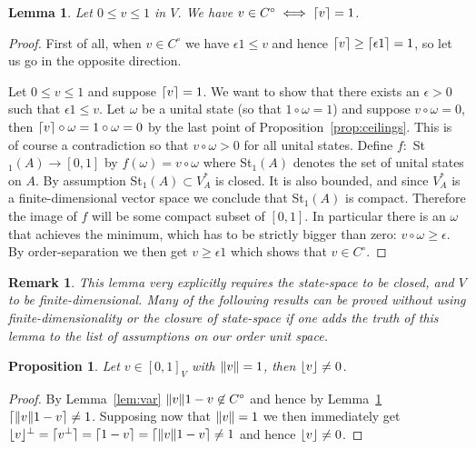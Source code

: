 \documentclass[b5paper,onecolumn,12pt,accepted=2019-05-03, issue=1, volume=1, shorttitle=papers/compositionality-1-1]{compositionalityarticle}
\DeclarePairedDelimiter{\ceil}{\lceil}{\rceil}
\DeclarePairedDelimiter{\floor}{\lfloor}{\rfloor}
\newcounter{counter}
\numberwithin{counter}{section}
\newtheorem{proposition}[counter]{Proposition}
\newtheorem{lemma}[counter]{Lemma}
\newtheorem{remark}[counter]{Remark}
\begin{document}
\begin{lemma}\label{lem:finitedimrank}
    Let $0\leq v\leq 1$ in $V$. We have $v\in C^\circ \iff \ceil{v}=1$.
\end{lemma}
\begin{proof}
    First of all, when $v\in C^\circ$ we have $\epsilon 1\leq v$ and hence $\ceil{v}\geq \ceil{\epsilon 1} = 1$, so let us go in the opposite direction.

    Let $0\leq v\leq 1$ and suppose $\ceil{v}=1$. We want to show that there exists an $\epsilon>0$ such that $\epsilon 1\leq v$. Let $\omega$ be a unital state (so that $1\circ \omega = 1$) and suppose $v\circ \omega = 0$, then $\ceil{v}\circ\omega = 1\circ\omega = 0$ by the last point of Proposition~\ref{prop:ceilings}. This is of course a contradiction so that $v\circ \omega>0$ for all unital states. Define $f:$ St$_1(A)\rightarrow [0,1]$ by $f(\omega)=v\circ \omega$ where St$_1(A)$ denotes the set of unital states on $A$. By assumption St$_1(A)\subset V_A^*$ is closed. It is also bounded, and since $V_A^*$ is a finite-dimensional vector space we conclude that St$_1(A)$ is compact. Therefore the image of $f$ will be some compact subset of $[0,1]$. In particular there is an $\omega$ that achieves the minimum, which has to be strictly bigger than zero: $v\circ\omega \geq \epsilon$. By order-separation we then get $v\geq \epsilon 1$ which shows that $v\in C^\circ$.
\end{proof}

\begin{remark}
    This lemma very explicitly requires the state-space to be closed, and $V$ to be finite-dimensional. Many of the following results can be proved without using finite-dimensionality or the closure of state-space if one adds the truth of this lemma to the list of assumptions on our order unit space.
\end{remark}

\begin{proposition} \label{prop:ceilint}
    Let $v\in [0,1]_V$ with $\norm{v}=1$, then $\floor{v}\neq 0$.
\end{proposition}
\begin{proof}
	By Lemma~\ref{lem:var} $\norm{v}1-v \not\in C^\circ$ and hence by Lemma~\ref{lem:finitedimrank} $\ceil{\norm{v}1-v} \neq 1$. Supposing now that $\norm{v}=1$ we then immediately get $\floor{v}^\perp = \ceil{v^\perp} = \ceil{1-v} = \ceil{\norm{v}1 -v} \neq 1$ and hence $\floor{v}\neq 0$.
\end{proof}
\end{document}

